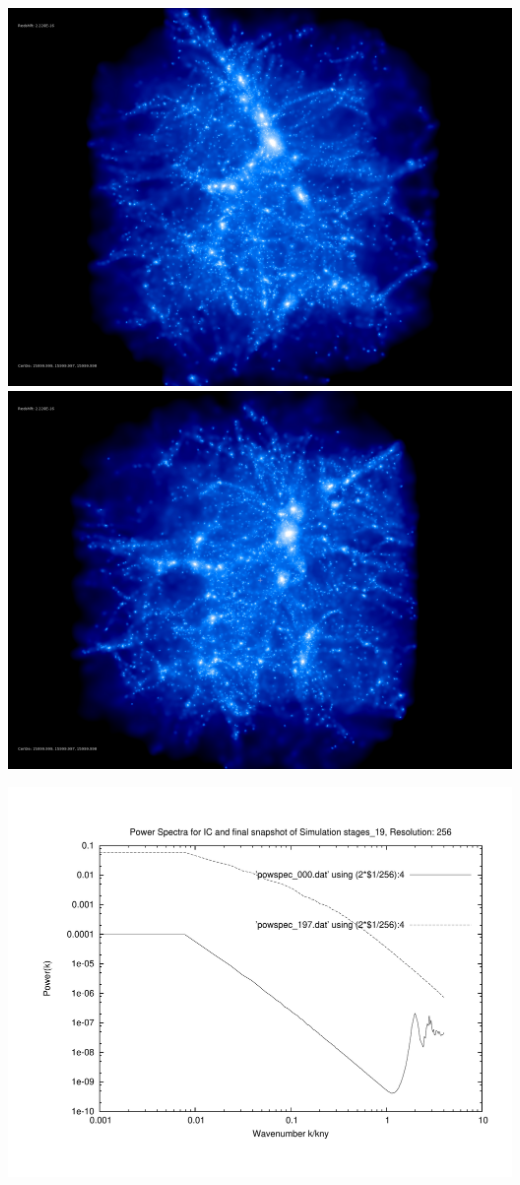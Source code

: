 \includegraphics[scale=0.1]{r256/h100/stages_19/rotate_00074.jpg} 
\includegraphics[scale=0.1]{r256/h100/stages_19/rotate_00131.jpg}

\includegraphics[scale=0.5]{r256/h100/stages_19/plot_powspec_stages_19}

